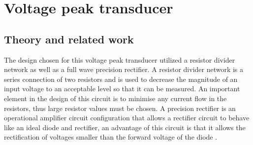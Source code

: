 \chapter{Voltage peak transducer}
\section{Theory and related work} \label{sec:literature_voltage_peak_transducer}
The design chosen for this voltage peak transducer utilized a resistor divider network as well as a full wave precision rectifier. A resistor divider network is a series connection of two resistors and is used to decrease the magnitude of an input voltage to an acceptable level so that it can be measured. An important element in the design of this circuit is to minimise any current flow in the resistors, thus large resistor values must be chosen. A precision rectifier is an operational amplifier circuit configuration that allows a rectifier circuit to behave like an ideal diode and rectifier, an advantage of this circuit is that it allows the rectification of voltages smaller than the forward voltage of the diode \cite{PrecisionRectifier}.

